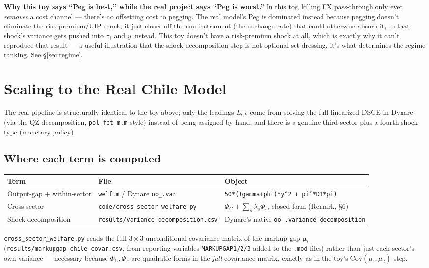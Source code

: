 \documentclass[12pt]{article}
\begin{document}
\begin{insight}
\textbf{Why this toy says ``Peg is best,'' while the real project says ``Peg is worst.''} In this
toy, killing FX pass-through only ever \emph{removes} a cost channel — there's no offsetting cost to
pegging. The real model's Peg is dominated instead because pegging doesn't eliminate the
risk-premium/UIP shock, it just closes off the one instrument (the exchange rate) that could
otherwise absorb it, so that shock's variance gets pushed into $\pi_i$ and $y$ instead. This toy
doesn't have a risk-premium shock at all, which is exactly why it can't reproduce that result — a
useful illustration that the shock decomposition step is not optional set-dressing, it's what
determines the regime ranking. See \S\ref{sec:regime}.
\end{insight}

\section{Scaling to the Real Chile Model}
\label{sec:real}

The real pipeline is structurally identical to the toy above; only the loadings $L_{i,k}$ come from
solving the full linearized DSGE in Dynare (via the QZ decomposition, \texttt{pol\_fct\_m.m}-style)
instead of being assigned by hand, and there is a genuine third sector plus a fourth shock type
(monetary policy).

\subsection{Where each term is computed}
\begin{center}
\begin{tabular}{lll}
\toprule
Term & File & Object \\
\midrule
Output-gap + within-sector & \texttt{welf.m} / Dynare \texttt{oo\_.var} & \texttt{50*((gamma+phi)*y\^{}2 + pi'*D1*pi)} \\
Cross-sector & \texttt{code/cross\_sector\_welfare.py} & $\Phi_C + \sum_s\lambda_s\Phi_s$, closed form (Remark, \S6) \\
Shock decomposition & \texttt{results/variance\_decomposition.csv} & Dynare's native \texttt{oo\_.variance\_decomposition} \\
\bottomrule
\end{tabular}
\end{center}
\texttt{cross\_sector\_welfare.py} reads the full $3\times3$ unconditional covariance matrix of the
markup gap $\bm\mu_t$ (\texttt{results/markupgap\_chile\_covar.csv}, from reporting variables
\texttt{MARKUPGAP1/2/3} added to the \texttt{.mod} files) rather than just each sector's own
variance — necessary because $\Phi_C,\Phi_s$ are quadratic forms in the \emph{full} covariance
matrix, exactly as in the toy's $\mathrm{Cov}(\mu_1,\mu_2)$ step.
\end{document}

